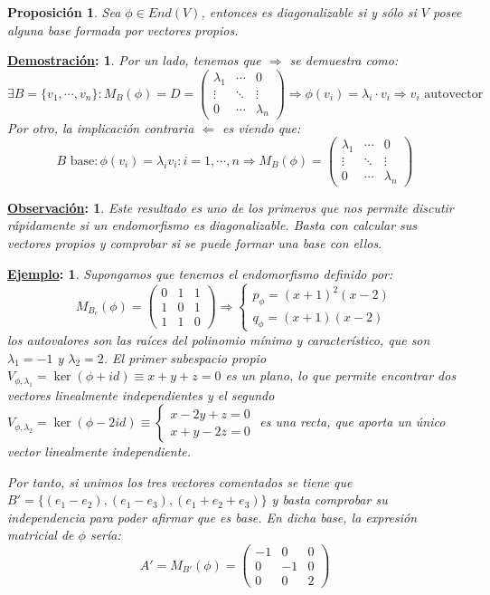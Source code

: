 \documentclass[10pt,a4paper,openright]{book}
\theoremstyle{break}
\newtheorem*{prop}{Proposición}
\newtheorem*{demo}{\underline{Demostración}:}
\newtheorem*{obs}{\underline{Observación}:}
\newtheorem*{ej}{\underline{Ejemplo}:}
\begin{document}
\begin{prop}
Sea $\phi\in End(V)$, entonces es diagonalizable si y sólo si $V$ posee alguna base formada por vectores propios.
\end{prop}
\begin{demo}
Por un lado, tenemos que $\Rightarrow$ se demuestra como:
$$\exists B=\{v_1, \cdots, v_n\} : M_B(\phi)=D=\begin{pmatrix}
\lambda_1 & \cdots & 0 \\
\vdots & \ddots & \vdots \\
0 & \cdots & \lambda_n
\end{pmatrix}\Rightarrow \phi(v_i)=\lambda_i \cdot v_i\Rightarrow v_i \mbox{ autovector}$$
Por otro, la implicación contraria $\Leftarrow$ es viendo que:
$$B\mbox{ base}: \phi(v_i)=\lambda_iv_i: i=1,\cdots, n\Rightarrow M_B(\phi)=\begin{pmatrix}
\lambda_1 & \cdots & 0 \\
\vdots & \ddots & \vdots \\
0 & \cdots & \lambda_n
\end{pmatrix}$$
\end{demo}

\begin{obs}
Este resultado es uno de los primeros que nos permite discutir rápidamente si un endomorfismo es diagonalizable. Basta con calcular sus vectores propios y comprobar si se puede formar una base con ellos.
\end{obs}

\begin{ej}
Supongamos que tenemos el endomorfismo definido por:
$$
M_{B_c}(\phi)=\begin{pmatrix} 0&1&1\\1&0&1\\1&1&0 \end{pmatrix} \Rightarrow \begin{cases}
p_\phi= (x+1)^2(x-2) \\ q_\phi=(x+1)(x-2)
\end{cases}
$$
los autovalores son las raíces del polinomio mínimo y característico, que son $\lambda_1 = -1$ y $\lambda_2 = 2$. El primer subespacio propio $V_{\phi, \lambda_1}= \ker(\phi+id) \equiv x+y+z=0$ es un plano, lo que permite encontrar dos vectores linealmente independientes y el segundo $V_{\phi,\lambda_2}=\ker(\phi-2id)\equiv \begin{cases}x-2y+z=0 \\ x+y-2z=0\end{cases}$ es una recta, que aporta un único vector linealmente independiente.

Por tanto, si unimos los tres vectores comentados se tiene que $B'=\{(e_1-e_2), (e_1-e_3), (e_1+e_2+e_3)\}$ y basta comprobar su independencia para poder afirmar que es base. En dicha base, la expresión matricial de $\phi$ sería:
$$
A'=M_{B'}(\phi)=\begin{pmatrix}-1&0&0\\0&-1&0\\0&0&2\end{pmatrix}
$$
\end{ej}
\end{document}
